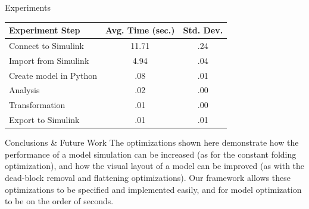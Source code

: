 \documentclass[final,hyperref={pdfpagelabels=false}]{beamer}
\begin{document}
\begin{frame}{}
\begin{columns}[t,totalwidth=\linewidth]
\begin{column}{.4\linewidth}
\begin{block}{Experiments}
\begin{table}[h]
\begin{tabular}{l | c c }
	          \textbf{Experiment Step} & \textbf{Avg. Time (sec.)} & \textbf{Std. Dev.} \\\hline
	           
	          Connect to Simulink & 11.71 & .24 \\
	          Import from Simulink & 4.94 & .04 \\
	          Create model in Python & .08 & .01 \\
	          Analysis & .02 & .00 \\
	          Transformation & .01 & .00 \\
	          Export to Simulink & .01 & .01 \\
	          
	          
	          \end{tabular}
	          
	          \end{table}
             \end{block}
             \vspace{-0.2cm}
             \begin{block}{Conclusions \& Future Work}
             \footnotesize
        	   The optimizations shown here demonstrate how the performance of a model simulation can be increased (as for the constant folding optimization), and how the visual layout of a model can be improved (as with the dead-block removal and flattening optimizations). Our framework allows these optimizations to be specified and implemented easily, and for model optimization to be on the order of seconds.
        	   

\end{block}
\end{column}
\end{columns}
\end{frame}
\end{document}

